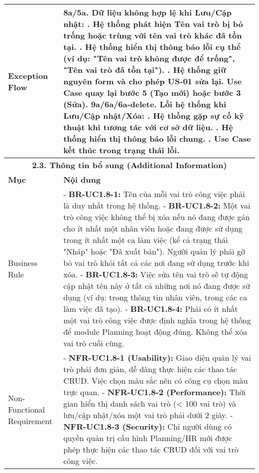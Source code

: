 \begin{longtable}{|m{4cm}|p{11cm}|}
\hline
Exception Flow & \textbf{8a/5a. Dữ liệu không hợp lệ khi Lưu/Cập nhật:} \newline    1. Hệ thống phát hiện Tên vai trò bị bỏ trống hoặc trùng với tên vai trò khác đã tồn tại. \newline    2. Hệ thống hiển thị thông báo lỗi cụ thể (ví dụ: "Tên vai trò không được để trống", "Tên vai trò đã tồn tại"). \newline    3. Hệ thống giữ nguyên form và cho phép US-01 sửa lại. Use Case quay lại bước 5 (Tạo mới) hoặc bước 3 (Sửa). \newline \textbf{9a/6a/6a-delete. Lỗi hệ thống khi Lưu/Cập nhật/Xóa:} \newline    1. Hệ thống gặp sự cố kỹ thuật khi tương tác với cơ sở dữ liệu. \newline    2. Hệ thống hiển thị thông báo lỗi chung. \newline    3. Use Case kết thúc trong trạng thái lỗi. \\
\hline
\multicolumn{2}{|c|}{\textbf{2.3. Thông tin bổ sung (Additional Information)}} \\
\hline
\textbf{Mục} & \textbf{Nội dung} \\
\hline
Business Rule & - \textbf{BR-UC1.8-1:} Tên của mỗi vai trò công việc phải là duy nhất trong hệ thống. \newline - \textbf{BR-UC1.8-2:} Một vai trò công việc không thể bị xóa nếu nó đang được gán cho ít nhất một nhân viên hoặc đang được sử dụng trong ít nhất một ca làm việc (kể cả trạng thái "Nháp" hoặc "Đã xuất bản"). Người quản lý phải gỡ bỏ vai trò khỏi tất cả các nơi đang sử dụng trước khi xóa. \newline - \textbf{BR-UC1.8-3:} Việc sửa tên vai trò sẽ tự động cập nhật tên này ở tất cả những nơi nó đang được sử dụng (ví dụ: trong thông tin nhân viên, trong các ca làm việc đã tạo). \newline - \textbf{BR-UC1.8-4:} Phải có ít nhất một vai trò công việc được định nghĩa trong hệ thống để module Planning hoạt động đúng. Không thể xóa vai trò cuối cùng. \\
\hline
Non-Functional Requirement & - \textbf{NFR-UC1.8-1 (Usability):} Giao diện quản lý vai trò phải đơn giản, dễ dàng thực hiện các thao tác CRUD. Việc chọn màu sắc nên có công cụ chọn màu trực quan. \newline - \textbf{NFR-UC1.8-2 (Performance):} Thời gian hiển thị danh sách vai trò (< 100 vai trò) và lưu/cập nhật/xóa một vai trò phải dưới 2 giây. \newline - \textbf{NFR-UC1.8-3 (Security):} Chỉ người dùng có quyền quản trị cấu hình Planning/HR mới được phép thực hiện các thao tác CRUD đối với vai trò công việc. \\
\hline

\end{longtable}

